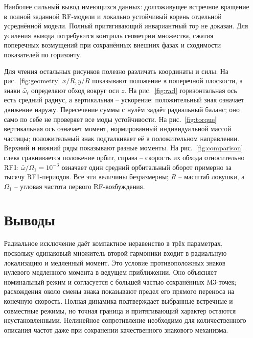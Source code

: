 \documentclass[aip,cha,reprint,a4paper,amsmath,amssymb]{revtex4-2}
\begin{document}
Наиболее сильный вывод имеющихся данных: долгоживущее встречное вращение в полной заданной RF-модели и локально устойчивый корень отдельной усреднённой модели. Полный притягивающий инвариантный тор не доказан. Для усиления вывода потребуются контроль геометрии множества, сжатия поперечных возмущений при сохранённых внешних фазах и сходимости показателей по горизонту.

Для чтения остальных рисунков полезно различать координаты и силы. На рис.~\ref{fig:geometry} $x/R,y/R$ показывают положение в поперечной плоскости, а знаки $\bar\omega_i$ определяют обход вокруг оси $z$. На рис.~\ref{fig:rad} горизонтальная ось есть средний радиус, а вертикальная -- ускорение: положительный знак означает движение наружу. Пересечение суммы с нулём задаёт радиальный баланс; оно само по себе не проверяет все моды устойчивости. На рис.~\ref{fig:torque} вертикальная ось означает момент, нормированный индивидуальной массой частицы; положительный знак подталкивает её в положительном направлении. Верхний и нижний ряды показывают разные моменты. На рис.~\ref{fig:comparison} слева сравнивается положение орбит, справа -- скорость их обхода относительно RF1: $\bar\omega/\Omega_1=10^{-3}$ означает один средний орбитальный оборот примерно за тысячу RF1-периодов. Все эти величины безразмерны; $R$ -- масштаб ловушки, а $\Omega_1$ -- угловая частота первого RF-возбуждения.

\section{Выводы}
Радиальное исключение даёт компактное неравенство в трёх параметрах, поскольку одинаковый множитель второй гармоники входит в радиальную локализацию и медленный момент. Это условие противоположных знаков нулевого медленного момента в ведущем приближении. Оно объясняет номинальный режим и согласуется с большей частью сохранённых M3-точек; расхождения около смены знака показывают предел его прямого переноса на конечную скорость. Полная динамика подтверждает выбранные встречные и совместные режимы, но точная граница и притягивающий характер остаются неустановленными. Нелинейное сопротивление необходимо для количественного описания частот даже при сохранении качественного знакового механизма.
\end{document}
